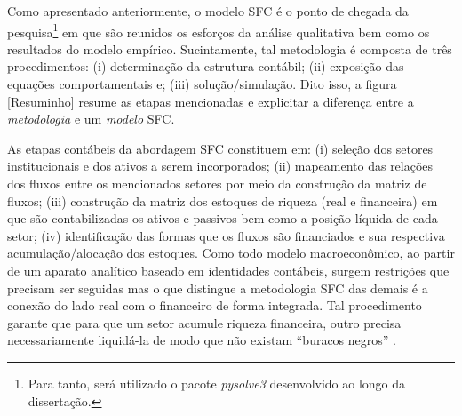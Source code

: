 Como apresentado anteriormente, o modelo SFC é o ponto de chegada da pesquisa\footnote{Para tanto, será utilizado o pacote \textit{pysolve3} desenvolvido ao longo da dissertação.} em que são reunidos os esforços da análise qualitativa bem como os resultados do modelo empírico. Sucintamente, tal metodologia é composta de três procedimentos: (i) determinação da estrutura contábil; (ii) exposição das equações comportamentais e; (iii) solução/simulação. Dito isso, a figura \ref{Resuminho} resume as etapas mencionadas e explicitar a diferença entre a \textit{metodologia} e um \textit{modelo} SFC. 




As etapas contábeis da abordagem SFC constituem em: (i) seleção dos setores institucionais e dos ativos a serem incorporados; (ii) mapeamento das relações dos fluxos entre os mencionados setores por meio da construção da matriz de fluxos; (iii) construção da matriz dos estoques de riqueza (real e financeira) em que são contabilizadas os ativos e passivos  bem como a posição líquida de cada setor; (iv) identificação das formas que os fluxos são financiados e sua respectiva acumulação/alocação dos estoques. 
Como todo modelo macroeconômico, ao partir de um aparato analítico
baseado em identidades contábeis, surgem restrições que precisam ser seguidas mas o que distingue
a metodologia SFC das demais é a conexão do lado real com o financeiro de forma integrada.
Tal procedimento garante que para que um setor acumule riqueza financeira, outro precisa necessariamente liquidá-la de modo que não existam ``buracos negros'' \cite{godley_money_1996}.


